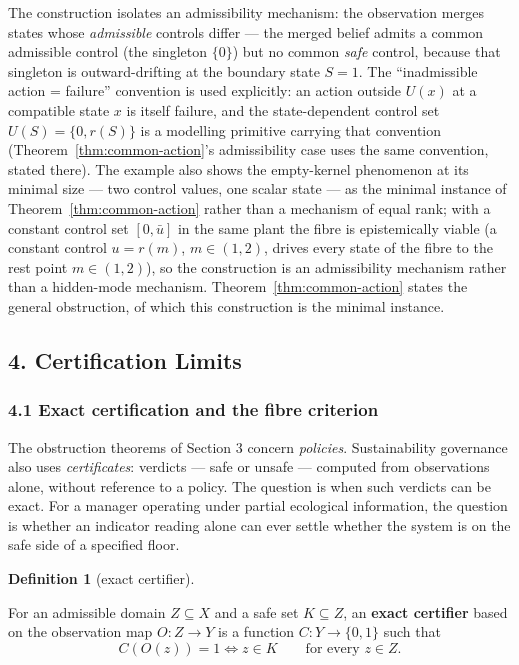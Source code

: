 \documentclass[10pt,twocolumn]{article}
\theoremstyle{definition}
\newtheorem{definition}{Definition}
\begin{document}
The construction isolates an admissibility mechanism: the observation merges states whose \emph{admissible}
controls differ --- the merged belief admits a common admissible control
(the singleton \(\{0\}\)) but no common \emph{safe} control, because
that singleton is outward-drifting at the boundary state \(S = 1\). The
``inadmissible action = failure'' convention is used explicitly: an action outside \(U(x)\) at a compatible state \(x\) is
itself failure, and the state-dependent control set
\(U(S) = \{0, r(S)\}\) is a modelling primitive carrying that convention
(Theorem~\ref{thm:common-action}'s admissibility case uses the same convention, stated there).
The example also shows the empty-kernel phenomenon at its minimal size
--- two control values, one scalar state --- as the minimal instance of
Theorem~\ref{thm:common-action} rather than a mechanism of equal rank; with a constant control
set \([0, \bar u]\) in the same plant the fibre is epistemically viable
(a constant control \(u = r(m)\), \(m \in (1,2)\), drives every state of
the fibre to the rest point \(m \in (1,2)\)), so the construction is an admissibility mechanism rather than a hidden-mode mechanism. Theorem~\ref{thm:common-action} states the general obstruction, of which this construction is
the minimal instance.

\subsection{4. Certification Limits}\label{certification-limits}

\subsubsection{4.1 Exact certification and the fibre
criterion}\label{exact-certification-and-the-fibre-criterion}

The obstruction theorems of Section 3 concern \emph{policies}.
Sustainability governance also uses \emph{certificates}: verdicts
--- safe or unsafe --- computed from observations alone, without
reference to a policy. The question is when such verdicts can be exact.
For a manager operating under partial ecological information, the question is whether an indicator reading alone can ever settle whether the system is on the safe side of a specified floor.

\begin{definition}[exact certifier]\label{def:certifier}

For an admissible domain
\(Z \subseteq X\) and a safe set \(K \subseteq Z\), an \textbf{exact
certifier} based on the observation map \(O : Z \to Y\) is a function
\(C : Y \to \{0,1\}\) such that
\[C(O(z)) = 1 \iff z \in K \qquad \text{for every } z \in Z.\]

\end{definition}
\end{document}
